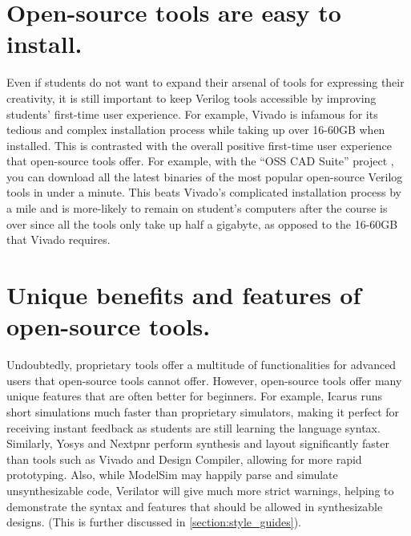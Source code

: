 \section{Open-source tools are easy to install.}

Even if students do not want to expand their arsenal of tools for expressing their creativity, it is still important to keep Verilog tools accessible by improving students' first-time user experience.
For example, Vivado is infamous for its tedious and complex installation process while taking up over 16-60GB when installed.
This is contrasted with the overall positive first-time user experience that open-source tools offer.
For example, with the \enquote{OSS CAD Suite} project \cite{osscadsuitebuildGitHub}, you can download all the latest binaries of the most popular open-source Verilog tools in under a minute.
This beats Vivado's complicated installation process by a mile and is more-likely to remain on student's computers after the course is over since all the tools only take up half a gigabyte, as opposed to the 16-60GB that Vivado requires.

\section{Unique benefits and features of open-source tools.}

Undoubtedly, proprietary tools offer a multitude of functionalities for advanced users that open-source tools cannot offer.
However, open-source tools offer many unique features that are often better for beginners.
For example, Icarus runs short simulations much faster than proprietary simulators, making it perfect for receiving instant feedback as students are still learning the language syntax.
Similarly, Yosys and Nextpnr perform synthesis and layout significantly faster than tools such as Vivado and Design Compiler, allowing for more rapid prototyping.
Also, while ModelSim may happily parse and simulate unsynthesizable code, Verilator will give much more strict warnings, helping to demonstrate the syntax and features that should be allowed in synthesizable designs.
(This is further discussed in \autoref{section:style_guides}).

